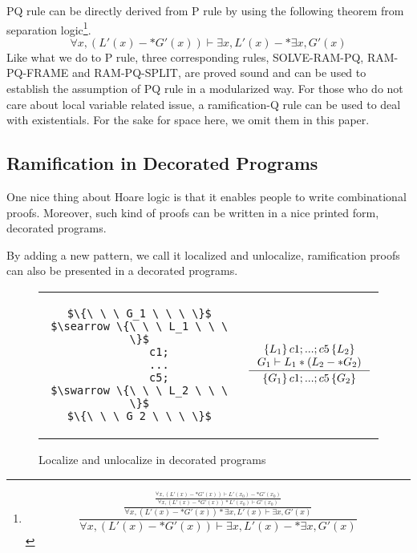 {PQ rule can be directly derived from P rule by using the following theorem from separation logic\footnote{
$$\frac{\frac{\frac{\forall x, (L' (x) -* G' (x)) \vdash L' (x_0) -* G' (x_0)}{\forall x, (L' (x) -* G' (x)) * L' (x_0) \vdash G' (x_0)}}
{\forall x, (L' (x) -* G' (x)) * \exists x, L' (x) \vdash \exists x, G' (x)}}
{\forall x, (L' (x) -* G' (x)) \vdash \exists x, L' (x) -* \exists x, G' (x)}$$
}.
$$\forall x, (L' (x) -* G' (x)) \vdash \exists x, L' (x) -* \exists x, G' (x)$$
Like what we do to P rule, three corresponding rules, SOLVE-RAM-PQ, RAM-PQ-FRAME and RAM-PQ-SPLIT, are proved sound and can be used to establish the assumption of PQ rule in a modularized way. For those who do not care about local variable related issue, a ramification-Q rule can be used to deal with existentials. For the sake for space here, we omit them in this paper.

\subsection{Ramification in Decorated Programs}

One nice thing about Hoare logic is that it enables people to write combinational proofs. Moreover, such kind of proofs can be written in a nice printed form, decorated programs. %

By adding a new pattern, we call it localized and unlocalize, ramification proofs can also be presented in a decorated programs.

\begin{figure}[h]
\begin{tabular}{c | c}
\begin{lstlisting}
$\{\ \ \ G_1 \ \ \ \}$
$\searrow \{\ \ \ L_1 \ \ \ \}$
      c1;
      ...
      c5;
$\swarrow \{\ \ \ L_2 \ \ \ \}$
$\{\ \ \ G_2 \ \ \ \}$
\end{lstlisting}
&
$$
\inference[]
{\triple{L_1}{c1;...;c5}{L_2} \\
G_1 \vdash L_1 * (L_2 -* G_2)
}
{\triple{G_1}{c1;...;c5}{G_2}}
$$
 \\
\end{tabular}
\caption{Localize and unlocalize in decorated programs}
\label{figure:lul}
\end{figure}

}
